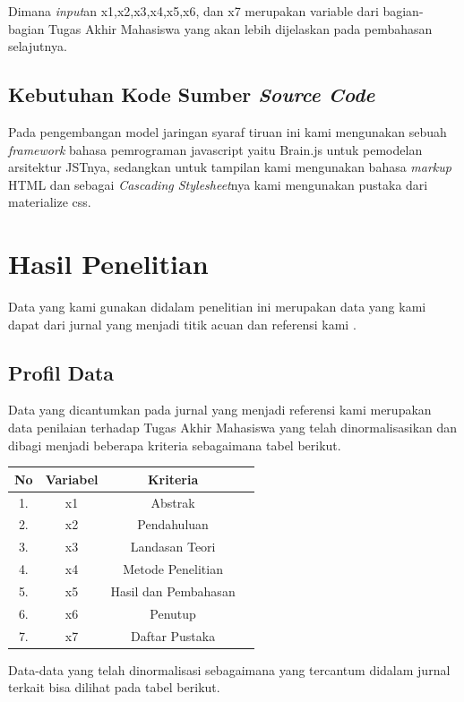  Dimana \emph{input}an x1,x2,x3,x4,x5,x6, dan x7 merupakan variable dari bagian-bagian Tugas Akhir Mahasiswa yang akan lebih dijelaskan pada pembahasan selajutnya.
 
 \subsection{Kebutuhan Kode Sumber \emph{Source Code}}
 Pada pengembangan model jaringan syaraf tiruan ini kami mengunakan sebuah \emph{framework} bahasa pemrograman javascript yaitu Brain.js untuk pemodelan arsitektur JSTnya, sedangkan untuk tampilan kami mengunakan bahasa \emph{markup} HTML dan sebagai \emph{Cascading Stylesheet}nya kami mengunakan pustaka dari materialize css.

\section{Hasil Penelitian}
Data yang kami gunakan didalam penelitian ini merupakan data yang kami dapat dari jurnal yang menjadi titik acuan dan referensi kami \cite{ZeksonArizonaMatondang}.
\subsection{Profil Data}
Data yang dicantumkan pada jurnal yang menjadi referensi kami merupakan data penilaian terhadap Tugas Akhir Mahasiswa yang telah dinormalisasikan dan dibagi menjadi beberapa kriteria sebagaimana tabel berikut.

\begin{center}
	\begin{tabular}{|c|c|c|c|}
		\hline
		No & Variabel & Kriteria \\
		\hline
		1.& x1 & Abstrak \\
		\hline
		2.& x2 & Pendahuluan \\
		\hline
		3.& x3 & Landasan Teori \\
		\hline
		4.& x4 & Metode Penelitian \\
		\hline
		5.& x5 & Hasil dan Pembahasan \\
		\hline
		6.& x6 & Penutup \\
		\hline
		7.& x7 & Daftar Pustaka \\
		\hline
	\end{tabular}
\end{center}
\par 
Data-data yang telah dinormalisasi sebagaimana yang tercantum didalam jurnal terkait bisa dilihat pada tabel berikut.

